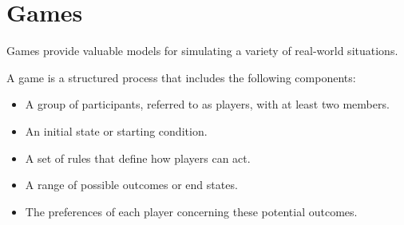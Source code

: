 \section{Games}

Games provide valuable models for simulating a variety of real-world situations.
\begin{definition}
    A game is a structured process that includes the following components:
    \begin{itemize}
        \item A group of participants, referred to as players, with at least two members.
        \item An initial state or starting condition.
        \item A set of rules that define how players can act.
        \item A range of possible outcomes or end states.
        \item The preferences of each player concerning these potential outcomes.
    \end{itemize}
\end{definition}